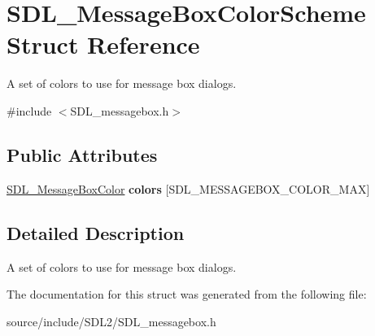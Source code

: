 \hypertarget{struct_s_d_l___message_box_color_scheme}{}\section{S\+D\+L\+\_\+\+Message\+Box\+Color\+Scheme Struct Reference}
\label{struct_s_d_l___message_box_color_scheme}


A set of colors to use for message box dialogs.  




{\ttfamily \#include $<$S\+D\+L\+\_\+messagebox.\+h$>$}

\subsection*{Public Attributes}
\begin{DoxyCompactItemize}
\item 
\hypertarget{struct_s_d_l___message_box_color_scheme_ae3712ec81e41b63b781b7d49d3b3b8f6}{}\hyperlink{struct_s_d_l___message_box_color}{S\+D\+L\+\_\+\+Message\+Box\+Color} {\bfseries colors} \mbox{[}S\+D\+L\+\_\+\+M\+E\+S\+S\+A\+G\+E\+B\+O\+X\+\_\+\+C\+O\+L\+O\+R\+\_\+\+M\+A\+X\mbox{]}\label{struct_s_d_l___message_box_color_scheme_ae3712ec81e41b63b781b7d49d3b3b8f6}

\end{DoxyCompactItemize}


\subsection{Detailed Description}
A set of colors to use for message box dialogs. 

The documentation for this struct was generated from the following file\+:\begin{DoxyCompactItemize}
\item 
source/include/\+S\+D\+L2/S\+D\+L\+\_\+messagebox.\+h\end{DoxyCompactItemize}
